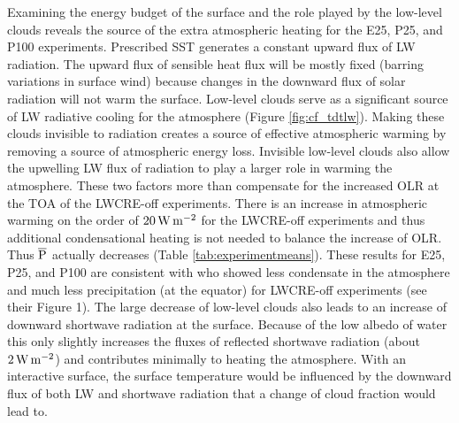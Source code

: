 \documentclass[draft]{agujournal2019}
\begin{document}
{Examining the energy budget of the surface and the role played by the low-level clouds
reveals the source of the extra atmospheric heating for the E25, P25, and P100 experiments.  
Prescribed SST generates a constant upward flux of LW radiation.  
The upward flux of sensible heat flux will be mostly fixed (barring variations in surface
wind) because changes in the downward flux of solar radiation will not warm the surface.  
Low-level clouds serve as a significant source of LW radiative cooling for the atmosphere (Figure \ref{fig:cf_tdtlw}).  
Making these clouds invisible to radiation creates a source of effective atmospheric warming by removing a source of atmospheric energy loss.  
Invisible low-level clouds also allow the upwelling LW flux of radiation to play a larger role in warming the atmosphere.
These two factors more than compensate for the increased OLR at the TOA of the LWCRE-off experiments.
There is an increase in atmospheric warming on the order of $20 \, \rm{W \,m^{-2}}$ for the LWCRE-off experiments and 
thus additional condensational heating is not needed to balance the increase of OLR. 
Thus $\overline{\rm{P}}$ actually decreases (Table \ref{tab:experimentmeans}).   
These results for E25, P25, and P100 are consistent with   who 
showed less condensate in the atmosphere and much less precipitation 
(at the equator) for LWCRE-off experiments (see their Figure 1).  
The large decrease of low-level clouds also leads to an increase of downward shortwave radiation at the surface.  
Because of the low albedo of water this only slightly increases the fluxes of reflected shortwave radiation (about $2 \, \rm{W \,m^{-2}}$) 
and contributes minimally to heating the atmosphere.
With an interactive surface, the surface temperature would be influenced
by the downward flux of both LW and shortwave radiation that a change of cloud fraction would lead to.   



}
\end{document}
